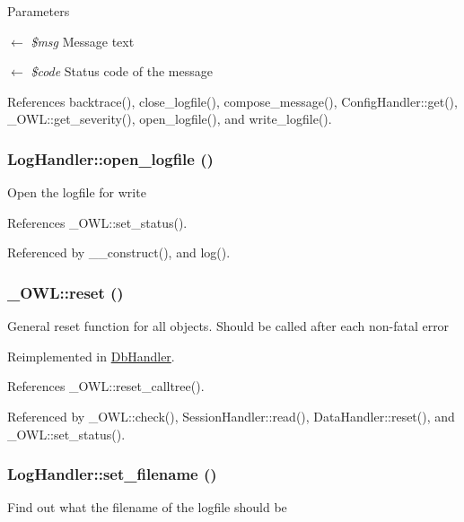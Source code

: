\begin{DoxyParams}{Parameters}
\item[\mbox{$\leftarrow$} {\em \$msg}]Message text \item[\mbox{$\leftarrow$} {\em \$code}]Status code of the message \end{DoxyParams}


References backtrace(), close\_\-logfile(), compose\_\-message(), ConfigHandler::get(), \_\-OWL::get\_\-severity(), open\_\-logfile(), and write\_\-logfile().

\subsubsection[{open\_\-logfile}]{\setlength{\rightskip}{0pt plus 5cm}LogHandler::open\_\-logfile ()}\label{classLogHandler_aaf324e5156bf8ea83e5b4e990ea99e2d}
Open the logfile for write 

References \_\-OWL::set\_\-status().



Referenced by \_\-\_\-construct(), and log().

\subsubsection[{reset}]{\setlength{\rightskip}{0pt plus 5cm}\_\-OWL::reset ()}\label{class__OWL_a2f2a042bcf31965194c03033df0edc9b}
General reset function for all objects. Should be called after each non-\/fatal error 

Reimplemented in \hyperlink{classDbHandler_a9982df4830f05803935bb31bac7fae3d}{DbHandler}.



References \_\-OWL::reset\_\-calltree().



Referenced by \_\-OWL::check(), SessionHandler::read(), DataHandler::reset(), and \_\-OWL::set\_\-status().

\subsubsection[{set\_\-filename}]{\setlength{\rightskip}{0pt plus 5cm}LogHandler::set\_\-filename ()}\label{classLogHandler_a65ef4f1c6ab4cff4057f5f5932cc690e}
Find out what the filename of the logfile should be 

